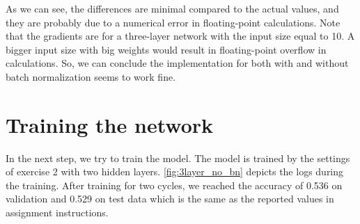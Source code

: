 \documentclass[a4paper]{article}
\begin{document}
As we can see, the differences are minimal compared to the actual values, and they are probably due to a numerical error in floating-point calculations.  Note that the gradients are for a three-layer network with the input size equal to 10. A bigger input size with big weights would result in floating-point overflow in calculations. So, we can conclude the implementation for both with and without batch normalization seems to work fine.


\section{Training the network}

In the next step, we try to train the model. The model is trained by the settings of exercise 2 with two hidden layers. \autoref{fig:3layer_no_bn} depicts the logs during the training. After training for two cycles, we reached the accuracy of 0.536 on validation and 0.529 on test data which is the same as the reported values in assignment instructions.
\end{document}
